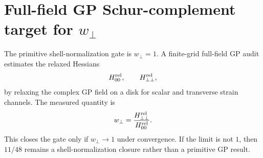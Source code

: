 \section{Full-field GP Schur-complement target for \(w_\perp\)}
The primitive shell-normalization gate is \(w_\perp=1\).  A finite-grid
full-field GP audit estimates the relaxed Hessians
\[
  H_{00}^{\rm rel},\qquad H_{\perp\perp}^{\rm rel},
\]
by relaxing the complex GP field on a disk for scalar and transverse strain
channels.  The measured quantity is
\[
  w_\perp=\frac{H_{\perp\perp}^{\rm rel}}{H_{00}^{\rm rel}}.
\]
This closes the gate only if \(w_\perp\to1\) under convergence.  If the limit is
not \(1\), then \(11/48\) remains a shell-normalization closure rather than a
primitive GP result.
